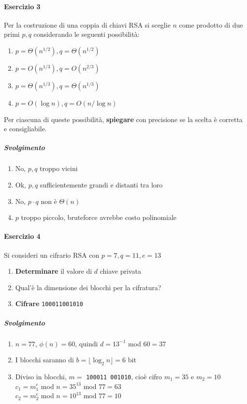 \documentclass[10pt]{book}
\begin{document}
\paragraph{Esercizio 3} Per la costruzione di una coppia di chiavi RSA si sceglie $n$ come prodotto di due primi $p,q$ considerando le seguenti possibilità:\begin{enumerate}
	\item$p=\Theta(n^{1/2}),q=\Theta(n^{1/2})$
	\item$p=O(n^{1/3}),q=O(n^{2/3})$
	\item$p=\Theta(n^{1/3}),q=\Theta(n^{1/3})$
	\item$p=O(\log n),q=O(n/\log n)$
\end{enumerate}
Per ciascuna di queste possibilità, \textbf{spiegare} con precisione se la scelta è corretta e consigliabile.
\subparagraph{Svolgimento} \begin{enumerate}
	\item No, $p,q$ troppo vicini
	\item Ok, $p,q$ sufficientemente grandi e distanti tra loro
	\item No, $p\cdot q$ non è $\Theta(n)$
	\item $p$ troppo piccolo, bruteforce avrebbe costo polinomiale
\end{enumerate}
\paragraph{Esercizio 4} Si consideri un cifrario RSA con $p = 7, q = 11, e = 13$
\begin{enumerate}
	\item \textbf{Determinare} il valore di $d$ chiave privata
	\item Qual'è la dimensione dei blocchi per la cifratura?
	\item \textbf{Cifrare} \texttt{100011001010}
\end{enumerate}
\subparagraph{Svolgimento} \begin{enumerate}
	\item $n = 77$, $\phi(n) = 60$, quindi $d = 13^{-1}$ mod $60 = 37$
	\item I blocchi saranno di $b = \lfloor\log_2 n\rfloor = 6$ bit
	\item Diviso in blocchi, $m =$ \texttt{100011 001010}, cioè cifro $m_1 = 35$ e $m_2 = 10$\\
	$c_1 = m_1^e$ mod $n = 35^{13}$ mod $77 = 63$\\
	$c_2 = m_2^e$ mod $n = 10^{13}$ mod $77 = 10$
\end{enumerate}
\pagebreak
\end{document}
